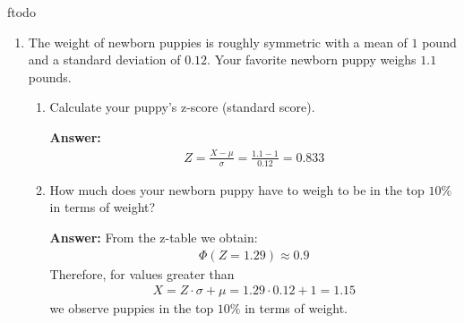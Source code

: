ƒtodo\documentclass{article}
\newenvironment{QandA}{\begin{enumerate}[label=\arabic*.]}{\end{enumerate}}
\newenvironment{InnerQandA}{\begin{enumerate}[label=\roman*.]}{\end{enumerate}}
\newenvironment{answer}{\par\normalfont \textbf{Answer:}}{}
\begin{document}
\begin{QandA}
\begin{answer}
\begin{align*}
        \end{align*}
        With this, we showed that $\rho \in [-1, 1]$.\\\\
        The correlation coefficient has two main characteristics:
        \begin{itemize}
            \item Strength -- signified by the absolute value of the coefficient. When the absolute value is $1$, then there is a perfect linear relationship between the variables. When the value is $0$, then there is no linear relationship. Finally, when the absolute value is between $0$ and $1$, then there is some linear relationship, but its strength depends on the value, and in general not all points fall on a single line.
            \item Direction -- signified by the sign of the coefficient. Positive correlation indicates that as the value of one variable increases, the value of the other variable also tends to increase. On the other hand, negative correlation indicates that as the value of one variable increases, the value of the other variable tends to decrease.
        \end{itemize}
        (Source: \href{https://en.wikipedia.org/wiki/Cauchy%E2%80%93Schwarz_inequality}{Wikipedia}, \href{https://statisticsbyjim.com/basics/correlations/}{StatisticsByJim})
    \end{answer}

    \item The weight of newborn puppies is roughly symmetric with a mean of $1$ pound and a standard deviation of $0.12$. Your favorite newborn puppy weighs $1.1$ pounds.
    \begin{InnerQandA}
        \item Calculate your puppy’s z-score (standard score).
        \begin{answer}
            \begin{align*}
                Z = \frac{X - \mu}{\sigma} = \frac{1.1 - 1}{0.12} = 0.833
            \end{align*}
        \end{answer}
        
        \item How much does your newborn puppy have to weigh to be in the top $10\%$ in terms of weight?
        \begin{answer}
            From the z-table we obtain:
            \begin{align*}
                \Phi(Z = 1.29) \approx 0.9
            \end{align*}
            Therefore, for values greater than 
            \begin{align*}
                X = Z \cdot \sigma + \mu = 1.29 \cdot 0.12 + 1 = 1.15
            \end{align*}
            we observe puppies in the top $10\%$ in terms of weight.
        \end{answer}


\end{InnerQandA}
\end{QandA}
\end{document}

